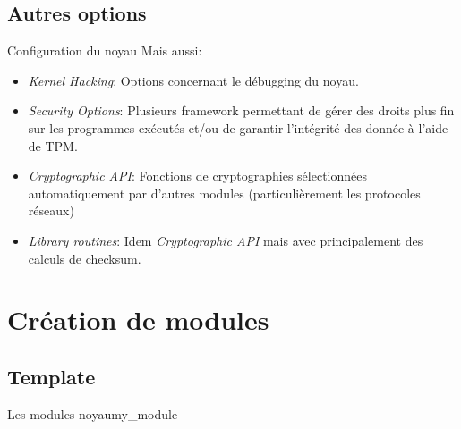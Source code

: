 \subsection{Autres options}

\begin{frame}[fragile=singleslide]{Configuration du noyau}
  Mais aussi:
  \begin{itemize} 
  \item \emph{Kernel  Hacking}:  Options  concernant le  débugging  du
    noyau. %
  \item  \emph{Security  Options}:  Plusieurs framework  permettant  de
    gérer des  droits plus  fin sur les  programmes exécutés  et/ou de
    garantir l'intégrité des donnée à l'aide de TPM.
  \item   \emph{Cryptographic   API}:   Fonctions   de   cryptographies
    sélectionnées     automatiquement     par     d'autres     modules
    (particulièrement les protocoles réseaux)
  \item  \emph{Library routines}: Idem  \emph{Cryptographic API}  mais
    avec principalement des calculs de checksum.
  \end{itemize} 
\end{frame}

\section{Création de modules}

\subsection{Template}

\begin{frame}[fragile=singleslide]{Les modules noyau}{my\_module}
  
\end{frame}

